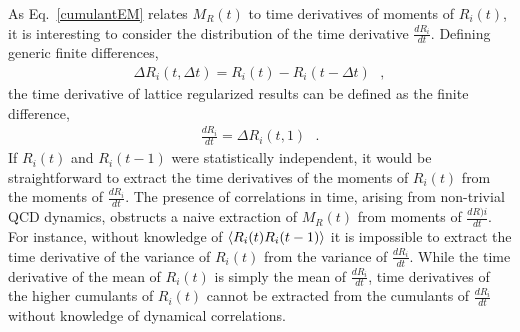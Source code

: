 As Eq.~\eqref{cumulantEM} relates $M_R(t)$ to time derivatives of moments of $R_i(t)$, it is interesting to consider the distribution of the time derivative $\frac{dR_i}{dt}$. 
Defining generic finite differences,
%
\begin{equation}
  \begin{split}
    \Delta R_i(t, \Delta t) = R_i(t) - R_i(t -  \Delta t)
    \ \ \  ,
  \end{split}
  \label{DeltaRdef}
\end{equation}
%
the time derivative of lattice regularized results can be defined as the finite difference,
%
\begin{equation}
  \begin{split}
    \frac{dR_i}{dt} = \Delta R_i(t, 1)
    \ \ \ .
  \end{split}
  \label{dRdtdef}
\end{equation}
%
If $R_i(t)$ and $R_i(t-1)$ were statistically independent,  it would be straightforward to extract the time derivatives of the 
moments of $R_i(t)$ from the moments of $\frac{dR_i}{dt}$. 
The presence of correlations in time, arising from non-trivial QCD dynamics, obstructs a naive extraction of 
$M_R(t)$ from moments of $\frac{dR)i}{dt}$. 
For instance, without knowledge of $\left< R_i(t)R_i(t-1) \right>$ it is impossible to extract the time derivative of the variance of 
$R_i(t)$ from the variance of $\frac{dR_i}{dt}$. 
While the time derivative of the mean of $R_i(t)$ is simply the mean of $\frac{dR_i}{dt}$, 
 time derivatives of the higher cumulants of $R_i(t)$ cannot be extracted from the cumulants of $\frac{dR_i}{dt}$ 
without knowledge of dynamical correlations.


